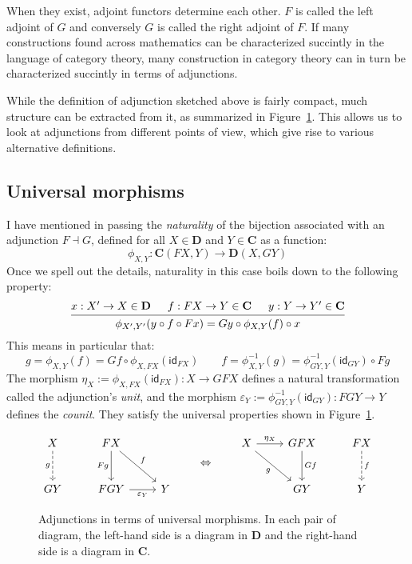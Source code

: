 \documentclass[11pt,oneside,draft]{book}
\theoremstyle{definition}
\newcommand{\kw}[1]{\ensuremath{ \mathsf{#1} }}
\begin{document}
When they exist,
adjoint functors determine each other.
$F$ is called the left adjoint of $G$ and
conversely
$G$ is called the right adjoint of $F$.
If many constructions found across mathematics
can be characterized succintly in the language of category theory,
many construction in category theory
can in turn be characterized succintly in terms of adjunctions.

While the definition of adjunction sketched above
is fairly compact,
much structure can be extracted from it,
as summarized in Figure~\ref{fig:adjunction}.
This allows us to look at adjunctions
from different points of view,
which give rise to various alternative definitions.


\subsection{Universal morphisms} %

I have mentioned in passing the \emph{naturality}
of the bijection associated with an adjunction $F \dashv G$,
defined for all $X \in \mathbf{D}$ and $Y \in \mathbf{C}$ as
a function:
\[
  \phi_{X, Y} : \mathbf{C}(F X, Y) \rightarrow \mathbf{D}(X, G Y)
\]
Once we spell out the details,
naturality in this case boils down to the following property:
\[
  \begin{prooftree}
    \hypo{x : X' \rightarrow X \in \mathbf{D}}
    \hypo{f : F X \rightarrow Y \in \mathbf{C}}
    \hypo{y : Y \rightarrow Y' \in \mathbf{C}}
    \infer3{\phi_{X',Y'}(y \circ f \circ F x) =
            G y \circ \phi_{X,Y}(f) \circ x}
  \end{prooftree}
\]
This means in particular that:
\[
  g = \phi_{X,Y}(f)
    = G f \circ \phi_{X,FX}(\kw{id}_{F X})
  \qquad
  f = \phi_{X,Y}^{-1}(g)
    = \phi_{GY,Y}^{-1}(\kw{id}_{G Y}) \circ F g
\]
The morphism
$\eta_X := \phi_{X,FX}(\kw{id}_{F X}) : X \rightarrow GFX$
defines a natural transformation
called the adjunction's \emph{unit},
and the morphism
$\varepsilon_Y := \phi_{GY,Y}^{-1}(\kw{id}_{G Y}) : FGY \rightarrow Y$
defines the \emph{counit}.
They satisfy the universal properties shown in
Figure~\ref{fig:adjunction}.

\begin{figure} %
  \[
    \begin{tikzcd}[row sep=large]
      X \ar[d, "g"', dashed] &
      FX \ar[d, "F g"'] \ar[dr, "f"] &
      \\
      G Y &
      F G Y \ar[r, "\varepsilon_Y"'] &
      Y
    \end{tikzcd}
    \qquad \Leftrightarrow \qquad
    \begin{tikzcd}[row sep=large]
      X \ar[r, "\eta_X"] \ar[dr, "g"'] &
      G F X \ar[d, "G f"] &
      F X \ar[d, "f", dashed]
      \\ &
      G Y & Y
    \end{tikzcd}
  \]
  \caption[Adjunctions in terms of universal morphisms]%
   {Adjunctions in terms of universal morphisms.
    In each pair of diagram,
    the left-hand side is a diagram in $\mathbf{D}$ and
    the right-hand side is a diagram in $\mathbf{C}$.}
  \label{fig:adjunction}
\end{figure}
\end{document}
